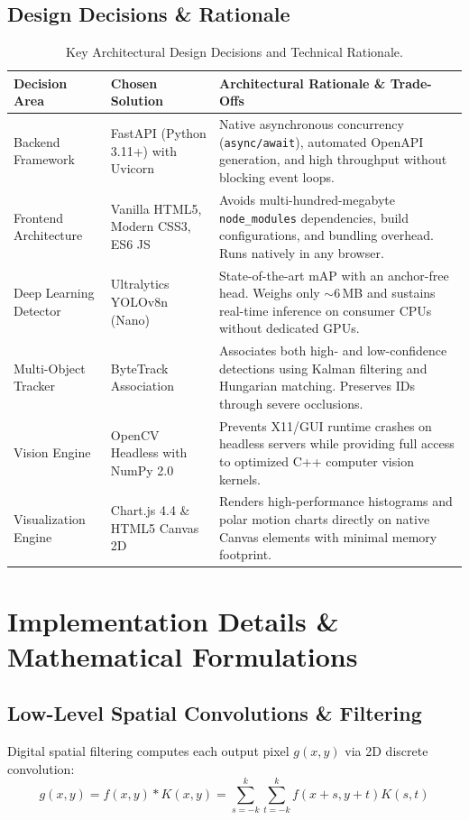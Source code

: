\documentclass[12pt,a4paper]{article}
\begin{document}
\subsection{Design Decisions \& Rationale}
\begin{table}[htbp]
\centering
\small
\caption{Key Architectural Design Decisions and Technical Rationale.}
\begin{tabular}{lp{3.5cm}p{7.5cm}}
\toprule
\textbf{Decision Area} & \textbf{Chosen Solution} & \textbf{Architectural Rationale \& Trade-Offs} \\
\midrule
Backend Framework & FastAPI (Python 3.11+) with Uvicorn & Native asynchronous concurrency (\texttt{async/await}), automated OpenAPI generation, and high throughput without blocking event loops. \\
Frontend Architecture & Vanilla HTML5, Modern CSS3, ES6 JS & Avoids multi-hundred-megabyte \texttt{node\_modules} dependencies, build configurations, and bundling overhead. Runs natively in any browser. \\
Deep Learning Detector & Ultralytics YOLOv8n (Nano) & State-of-the-art mAP with an anchor-free head. Weighs only $\sim 6$\,MB and sustains real-time inference on consumer CPUs without dedicated GPUs. \\
Multi-Object Tracker & ByteTrack Association & Associates both high- and low-confidence detections using Kalman filtering and Hungarian matching. Preserves IDs through severe occlusions. \\
Vision Engine & OpenCV Headless with NumPy 2.0 & Prevents X11/GUI runtime crashes on headless servers while providing full access to optimized C++ computer vision kernels. \\
Visualization Engine & Chart.js 4.4 \& HTML5 Canvas 2D & Renders high-performance histograms and polar motion charts directly on native Canvas elements with minimal memory footprint. \\
\bottomrule
\end{tabular}
\end{table}

\section{Implementation Details \& Mathematical Formulations}

\subsection{Low-Level Spatial Convolutions \& Filtering}
Digital spatial filtering computes each output pixel $g(x, y)$ via 2D discrete convolution:
\begin{equation}
g(x, y) = f(x, y) * K(x, y) = \sum_{s=-k}^{k} \sum_{t=-k}^{k} f(x+s, y+t) K(s, t)
\end{equation}
\end{document}
